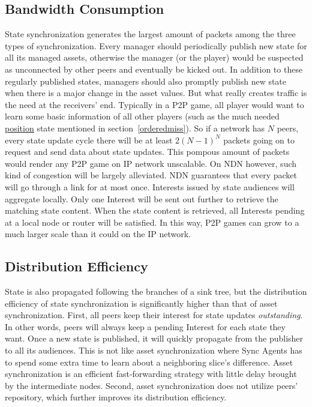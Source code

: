 \subsection{Bandwidth Consumption}
State synchronization generates the largest amount of packets among the three types of synchronization. Every manager should periodically publish new state for all its managed assets, otherwise the manager (or the player) would be suspected as unconnected by other peers and eventually be kicked out. In addition to these regularly published states, managers should also promptly publish new state when there is a major change in the asset values. But what really creates traffic is the need at the receivers' end. Typically in a P2P game, all player would want to learn some basic information of all other players (such as the much needed \url{position} state mentioned in section~\ref{orderedmiss}). So if a network has $N$ peers, every state update cycle there will be at least $2(N-1)^N$ packets going on to request and send data about state updates. This pompous amount of packets would render any P2P game on IP network unscalable. On NDN however, such kind of congestion will be largely alleviated. NDN guarantees that every packet will go through a link for at most once. Interests issued by state audiences will aggregate locally. Only one Interest will be sent out further to retrieve the matching state content. When the state content is retrieved, all Interests pending at a local node or router will be satisfied. In this way, P2P games can grow to a much larger scale than it could on the IP network.

\subsection{Distribution Efficiency}

State is also propagated following the branches of a sink tree, but the distribution efficiency of state synchronization is significantly higher than that of asset synchronization. First, all peers keep their interest for state updates \emph{outstanding}. In other words, peers will always keep a pending Interest for each state they want. Once a new state is published, it will quickly propagate from the publisher to all its audiences. This is not like asset synchronization where Sync Agents has to spend some extra time to learn about a neighboring slice's difference. Asset synchronization is an efficient fast-forwarding strategy with little delay brought by the intermediate nodes. Second, asset synchronization does not utilize peers' repository, which further improves its distribution efficiency.

